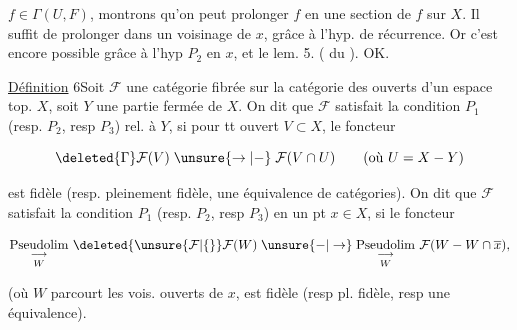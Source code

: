 
$f\in\Gamma(U,F)$, montrons qu'on peut prolonger $f$ en une section de $f$ sur $X$. Il suffit de prolonger dans un voisinage de $x$, grâce à l'hyp. de récurrence. Or c'est encore possible grâce à l'hyp $P_2$ en $x$, et le lem. 5. ( du ). OK.

\uline{Définition} 6\quad Soit $\mathcal F$ une catégorie fibrée sur la catégorie des ouverts d'un espace top. $X$, soit $Y$ une partie fermée de $X$. On dit que $\mathcal F$ satisfait la condition $P_1$  (resp. $P_2$, resp $P_3$) rel. à $Y$, si pour tt ouvert $V\subset X$, le foncteur


\[
\deleted{\Gamma}\mathcal F(V)\mathrel{\unsure{\to|-}}\mathcal F(V\cap U)\qquad(\text{où } U=X-Y)
\]

est fidèle (resp. pleinement fidèle,  une équivalence de catégories). On dit que $\mathcal F$ satisfait la condition $P_1$ (resp. $P_2$, resp $P_3$) en un pt $x\in X$, si le foncteur

\[
\underset{W}{\underset{\longrightarrow}{\mathrm{Pseudolim}}}\ \deleted{\unsure{\mathcal F|\{}}\mathcal F(W)\mathrel{\unsure{-|\to}}
\underset{W}{\underset{\longrightarrow}{\mathrm{Pseudolim}}}\ \mathcal F(W-W\cap\overline x),
\]

(où $W$ parcourt les vois. ouverts de $x$, est  fidèle (resp pl. fidèle, resp une équivalence).


